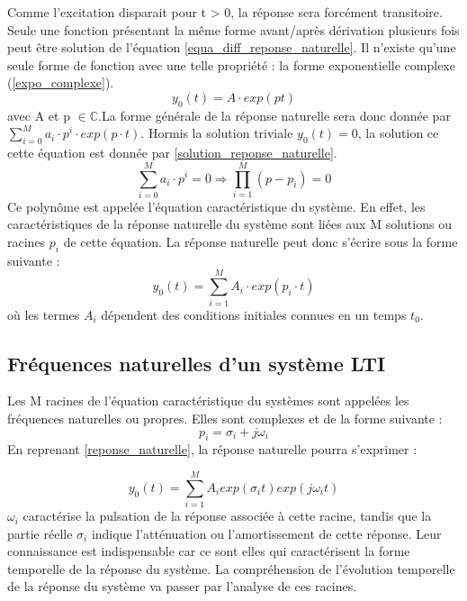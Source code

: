 \documentclass[]{report}
\begin{document}
	Comme l'excitation disparait pour t > 0, la réponse sera forcément transitoire. Seule une fonction présentant la même forme avant/après dérivation plusieurs fois peut être solution de l'équation \ref{equa_diff_reponse_naturelle}. Il n'existe qu'une seule forme de fonction avec une telle propriété : la forme exponentielle complexe (\ref{expo_complexe}).
	\begin{equation}\label{expo_complexe}
	y_{0}(t) = A \cdot exp(p t)       
	\end{equation}
	avec A et p $\in \mathbb{C}$.La forme générale de la réponse naturelle sera donc donnée par $ \sum_{i=0}^M a_{i}\cdot p^{i} \cdot exp(p \cdot t) $. Hormis la solution triviale $y_{0}(t) = 0$, la solution ce cette équation est donnée par \ref{solution_reponse_naturelle}.
	\begin{equation} \label{solution_reponse_naturelle}
	\sum_{i=0}^M a_{i}\cdot p^{i} = 0 \Rightarrow \prod_{i=1}^{M} (p-p_{i}) = 0     
	\end{equation}	
	Ce polynôme est appelée l'équation caractéristique du système. En effet, les caractéristiques de la réponse naturelle du système sont liées aux M solutions ou racines $p_{i}$ de cette équation. La réponse naturelle peut donc s'écrire sous la forme suivante :
	\begin{equation}\label{reponse_naturelle}
	y_{0}(t) = \sum_{i=1}^M A_{i}\cdot exp(p_{i} \cdot t) 
	\end{equation}
	où les termes $A_{i}$ dépendent des conditions initiales connues en un temps $ t_{0}$.
	
	\subsection{Fréquences naturelles d'un système LTI}
	Les M racines de l'équation caractéristique du systèmes sont appelées les fréquences naturelles ou propres. Elles sont complexes et de la forme suivante :
	\begin{equation}\label{freq_propre}
	p_{i} = \sigma_{i} + j\omega_{i} 
	\end{equation}	
	En reprenant \ref{reponse_naturelle}, la réponse naturelle pourra s'exprimer :
		
	\begin{equation}\label{Reponse_Naturelle}
	y_{0}(t) = \sum_{i=1}^M A_{i}exp(\sigma_{i}  t) exp(j\omega_{i} t)
	\end{equation}
	$\omega_{i}$ caractérise la pulsation de la réponse associée à cette racine, tandis que la partie réelle $\sigma_{i}$ indique l'atténuation ou l'amortissement de cette réponse. Leur connaissance est indispensable car ce sont elles qui caractérisent la forme temporelle de la réponse du système. La compréhension de l'évolution temporelle de la réponse du système va passer par l'analyse de ces racines. 
	
\end{document}
